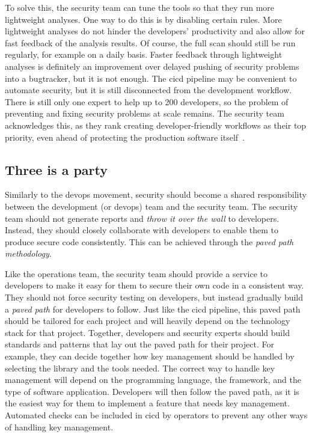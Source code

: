 To solve this, the security team can tune the tools so that they run more lightweight analyses. One way to do this is by disabling certain rules.
More lightweight analyses do not hinder the developers' productivity and also allow for fast feedback of the analysis results. Of course, the full scan should still be run regularly, for example on a daily basis. 
Faster feedback through lightweight analyses is definitely an improvement over delayed pushing of \glspl{security problem} into a \gls{bugtracker}, but it is not enough. 
The \gls{cicd} pipeline may be convenient to automate security, but it is still disconnected from the development workflow.
There is still only one expert to help up to 200 developers, so the problem of preventing and fixing \glspl{security problem} at scale remains.
The security team acknowledges this, as they rank creating developer-friendly workflows as their top priority, even ahead of protecting the production software itself~\cite{shiftleftsurvey}.

\subsection{Three is a party}

Similarly to the \gls{devops} movement, security should become a shared responsibility between the development (or \gls{devops}) team and the security team.
The security team should not generate reports and \textit{throw it over the wall} to developers.
Instead, they should closely collaborate with developers to enable them to produce secure code consistently. This can be achieved through the \textit{paved path methodology}. 

Like the operations team, the security team should provide a service to developers to make it easy for them to secure their own code in a consistent way.
They should not force security testing on developers, but instead gradually build a \textit{paved path} for developers to follow.
Just like the \gls{cicd} pipeline, this paved path should be tailored for each project and will heavily depend on the technology stack for that project.
Together, developers and security experts should build standards and patterns that lay out the paved path for their project.
For example, they can decide together how key management should be handled by selecting the library and the tools needed.
The correct way to handle key management will depend on the programming language, the framework, and the type of software application.
Developers will then follow the paved path, as it is the easiest way for them to implement a feature that needs key management.
Automated checks can be included in \Gls{cicd} by operators to prevent any other ways of handling key management.


